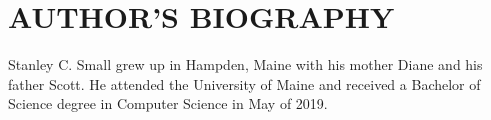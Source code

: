 \documentclass{article}
\begin{document}
\newpage
{}
\vspace*{.05in}
\section*{\MakeUppercase{Author's Biography}}
Stanley C. Small grew up in Hampden, Maine with his mother Diane and his father Scott. He attended the University of Maine and received a Bachelor of Science degree in Computer Science in May of 2019. 
\end{document}
